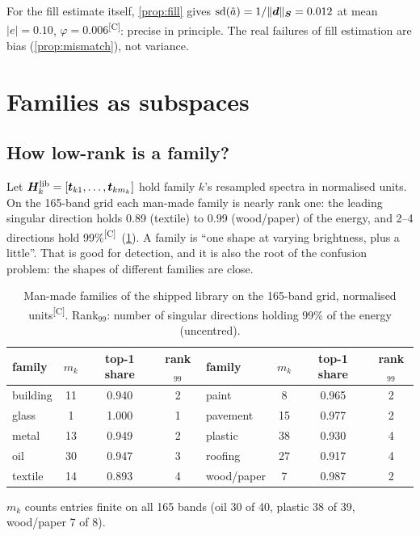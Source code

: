 \documentclass[11pt,a4paper]{article}
\theoremstyle{plain}
\theoremstyle{definition}
\theoremstyle{remark}
\newcommand{\tv}{\B{t}}
\newcommand{\dv}{\B{d}}
\newcommand{\Sm}{\B{S}}
\newcommand{\Hm}{\B{H}}
\newcommand{\nrm}[1]{\lVert #1\rVert}
\newcommand{\comp}{\textsuperscript{\textsf{\scriptsize[C]}}}
\begin{document}
For the fill estimate itself, \cref{prop:fill} gives $\mathrm{sd}(\hat a)=1/\nrm{\dv}_{\Sm}=0.012$ at mean
$|e|=0.10$, $\varphi=0.006$\comp: precise in principle. The real failures of fill estimation are bias
(\cref{prop:mismatch}), not variance.

\section{Families as subspaces}
\label{sec:families}

\subsection{How low-rank is a family?}

Let $\Hm_k^{\rm lib}=[\tv_{k1},\dots,\tv_{km_k}]$ hold family $k$'s resampled spectra in normalised units. On the
165-band grid each man-made family is nearly rank one: the leading singular direction holds 0.89 (textile) to
0.99 (wood/paper) of the energy, and 2--4 directions hold 99\%\comp\ (\cref{tab:rank}). A family is ``one shape at
varying brightness, plus a little''. That is good for detection, and it is also the root of the confusion problem:
the shapes of different families are close.

\begin{table}[ht]
\centering\small
\caption{Man-made families of the shipped library on the 165-band grid, normalised units\comp. Rank$_{99}$: number of
singular directions holding 99\% of the energy (uncentred).}
\label{tab:rank}
\begin{tabular}{@{}lccc@{\qquad}lccc@{}}
\toprule
family & $m_k$ & top-1 share & rank$_{99}$ & family & $m_k$ & top-1 share & rank$_{99}$\\
\midrule
building & 11 & 0.940 & 2 & paint & 8 & 0.965 & 2\\
glass & 1 & 1.000 & 1 & pavement & 15 & 0.977 & 2\\
metal & 13 & 0.949 & 2 & plastic & 38 & 0.930 & 4\\
oil & 30 & 0.947 & 3 & roofing & 27 & 0.917 & 4\\
textile & 14 & 0.893 & 4 & wood/paper & 7 & 0.987 & 2\\
\bottomrule
\end{tabular}
\par\smallskip\footnotesize $m_k$ counts entries finite on all 165 bands (oil 30 of 40, plastic 38 of 39, wood/paper 7 of 8).
\end{table}
\end{document}
